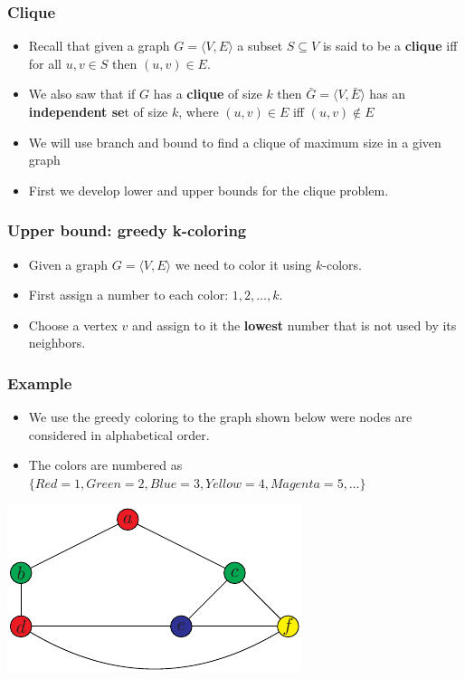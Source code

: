 \documentclass{beamer}
\begin{document}
\begin{frame}
  \frametitle{Clique}
  \begin{itemize}
  \item Recall that given a graph $G=\langle V,E\rangle$ a subset $S\subseteq V$ is said to be a \textbf{clique} iff for all $u,v\in S$ then $(u,v)\in E$.
\item We also saw that if $G$ has a \textbf{clique} of size $k$ then $\bar{G}=\langle V,\bar{E}\rangle$ has an \textbf{independent se}t of size $k$, where $(u,v)\in E$ iff $(u,v)\notin E$
\item We will use branch and bound to find a clique of maximum size in a given graph
\item First we develop  lower and upper bounds for the clique problem.
  \end{itemize}
\end{frame}
\begin{frame}
  \frametitle{Upper bound: greedy k-coloring}
  \begin{itemize}
  \item Given a graph $G=\langle V,E\rangle$ we need to color it using $k$-colors.
  \item First assign a number to each color: $1,2,\ldots,k$.
  \item Choose a vertex $v$ and assign to it the \textbf{lowest} number that is not used by its neighbors.
  \end{itemize}
\end{frame}
\begin{frame}
   \frametitle{Example}
  \begin{itemize}
  \item We use the greedy coloring to the graph shown below were nodes are considered in alphabetical order.
  \item The colors are numbered as $\{Red=1,Green=2,Blue=3,Yellow=4,Magenta=5,\ldots\}$
  \end{itemize}
  \begin{center}
    \includegraphics{coping-figs/greedy-kcolor-not-always}
  \end{center}
\end{frame}
\end{document}
